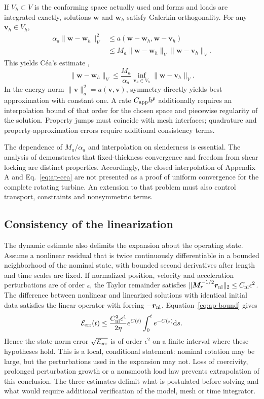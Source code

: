 If $V_h\subset V$ is the conforming space actually used and forms and loads are integrated exactly, solutions $\bm w$ and $\bm w_h$ satisfy Galerkin orthogonality. For any $\bm v_h\in V_h$,
\begin{align}
\alpha_a\|\bm w-\bm w_h\|_V^2
&\le a(\bm w-\bm w_h,\bm w-\bm v_h)\nonumber\\
&\le M_a\|\bm w-\bm w_h\|_V\|\bm w-\bm v_h\|_V.
\end{align}
This yields C\'ea's estimate \citep{cea1964},
\begin{equation}
\|\bm w-\bm w_h\|_V\le\frac{M_a}{\alpha_a}
\inf_{\bm v_h\in V_h}\|\bm w-\bm v_h\|_V.
\label{eq:ap-cea}
\end{equation}
In the energy norm $\|\bm v\|_a^2=a(\bm v,\bm v)$, symmetry directly yields best approximation with constant one. A rate $C_{\rm app}h^p$ additionally requires an interpolation bound of that order for the chosen space and piecewise regularity of the solution. Property jumps must coincide with mesh interfaces; quadrature and property-approximation errors require additional consistency terms.

The dependence of $M_a/\alpha_a$ and interpolation on slenderness is essential. The analysis of \citet{arnold1981} demonstrates that fixed-thickness convergence and freedom from shear locking are distinct properties. Accordingly, the closed interpolation of Appendix A and Eq.~\eqref{eq:ap-cea} are not presented as a proof of uniform convergence for the complete rotating turbine. An extension to that problem must also control transport, constraints and nonsymmetric terms.

\subsection{Consistency of the linearization}
The dynamic estimate also delimits the expansion about the operating state. Assume a nonlinear residual that is twice continuously differentiable in a bounded neighborhood of the nominal state, with bounded second derivatives after length and time scales are fixed. If normalized position, velocity and acceleration perturbations are of order $\epsilon$, the Taylor remainder satisfies $\|\bm M_r^{-1/2}\bm r_{\rm nl}\|_2\le C_{\rm nl}\epsilon^2$. The difference between nonlinear and linearized solutions with identical initial data satisfies the linear operator with forcing $-\bm r_{\rm nl}$. Equation~\eqref{eq:ap-bound} gives
\begin{equation}
\mathcal E_{\rm err}(t)\le
\frac{C_{\rm nl}^2\epsilon^4}{2\eta}
 e^{C(t)}\int_0^t e^{-C(s)}\mathrm d s.
\label{eq:ap-linearization}
\end{equation}
Hence the state-norm error $\sqrt{\mathcal E_{\rm err}}$ is of order $\epsilon^2$ on a finite interval where these hypotheses hold. This is a local, conditional statement: nominal rotation may be large, but the perturbations used in the expansion may not. Loss of coercivity, prolonged perturbation growth or a nonsmooth load law prevents extrapolation of this conclusion. The three estimates delimit what is postulated before solving and what would require additional verification of the model, mesh or time integrator.
